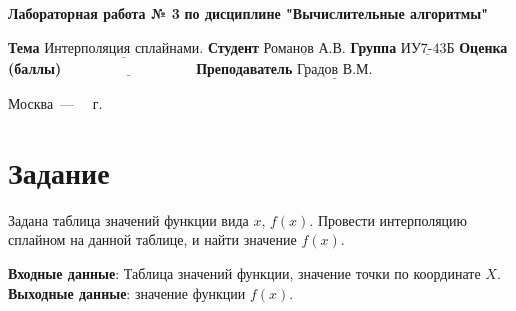 \documentclass[a4paper,12pt]{article}
\begin{document}
\begin{center}
	\noindent\begin{minipage}{1.3\textwidth}\centering
	\Large\textbf{  Лабораторная работа № 3}\newline
	\textbf{по дисциплине "Вычислительные алгоритмы"}\newline\newline\newline
	\end{minipage}
\end{center}

\noindent\textbf{Тема} $\underline{\text{Интерполяция сплайнами.}}$\newline\newline
\noindent\textbf{Студент} $\underline{\text{Романов А.В.}}$\newline\newline
\noindent\textbf{Группа} $\underline{\text{ИУ7-43Б}}$\newline\newline
\noindent\textbf{Оценка (баллы)} $\underline{\text{~~~~~~~~~~~~~~~~~~~~~~~~~~~}}$\newline\newline
\noindent\textbf{Преподаватель} $\underline{\text{Градов В.М.}}$\newline
	
\begin{center}
	\vfill
	Москва~---~\the\year
~г.
\end{center}
\clearpage
\section{Задание}

\textbf{}Задана таблица значений функции вида $x$, $f(x)$. Провести интерполяцию сплайном на данной таблице, и найти значение $f(x)$. \newline

\noindent\textbf{Входные данные}: Таблица значений функции, значение точки по координате $X$. \newline
\noindent\textbf{Выходные данные}: значение функции $f(x)$. \newline
\end{document}
